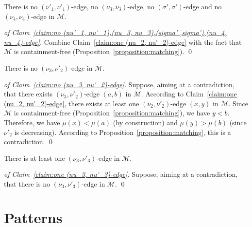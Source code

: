 \documentclass[a4paper,10pt]{llncs}
\begin{document}
\begin{claim}
  \label{claim:no (nu'_1, nu'_1),(nu_3, nu_3),(sigma' ,sigma'),(nu_4, nu_4)-edge}
  There is
  no $(\nu'_1, \nu'_1)$-edge,
  no $(\nu_3, \nu_3)$-edge,
  no $(\sigma', \sigma')$-edge and
  no $(\nu_4, \nu_4)$-edge
  in $\mathcal{M}$.
\end{claim}

\begin{proof}[of Claim~\ref{claim:no (nu'_1, nu'_1),(nu_3, nu_3),(sigma' ,sigma'),(nu_4, nu_4)-edge}]
  Combine Claim~\ref{claim:one (nu_2, nu'_2)-edge} with the fact that
  $\mathcal{M}$ is containment-free (Proposition~\ref{proposition:matching}).
  \qed
\end{proof}

\begin{claim}
  \label{claim:no (nu_3, nu'_2)-edge}
  There is no $(\nu_3, \nu'_2)$-edge in $\mathcal{M}$.
\end{claim}

\begin{proof}[of Claim~\ref{claim:no (nu_3, nu'_2)-edge}]
  Suppose, aiming at a contradiction, that there exists
  $(\nu_3, \nu'_2)$-edge $(a, b)$ in $\mathcal{M}$.
  According to Claim~\ref{claim:one (nu_2, nu'_2)-edge}, there
  exists at least one $(\nu_2, \nu'_2)$-edge $(x, y)$ in $\mathcal{M}$.
  Since $\mathcal{M}$ is containment-free (Proposition~\ref{proposition:matching}),
  we have $y < b$.
  Therefore,
  we have $\mu(x) < \mu(a)$ (by construction) and
  $\mu(y) > \mu(b)$ (since $\nu'_2$ is decreasing).
  According to Proposition~\ref{proposition:matching}, this is
  a contradiction.
  \qed
\end{proof}

\begin{claim}
  \label{claim:one (nu_3, nu'_3)-edge}
  There is at least one $(\nu_3, \nu'_3)$-edge in $\mathcal{M}$.
\end{claim}

\begin{proof}[of Claim~\ref{claim:one (nu_3, nu'_3)-edge}]
  Suppose, aiming at a contradiction, that there is no
  $(\nu_3, \nu'_3)$-edge in $\mathcal{M}$.
  \qed
\end{proof}


\section{Patterns}
\label{section:Patterns}
\end{document}
